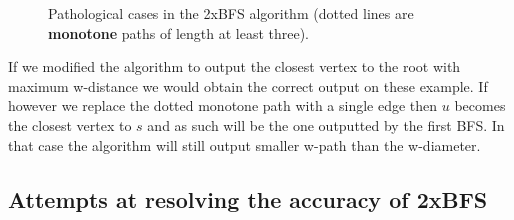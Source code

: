 \begin{figure}[h]
    \qquad
    \caption{Pathological cases in the 2xBFS algorithm (dotted lines are \textbf{monotone} paths of length at least three).}%
    \label{fig:path-cases}%
\end{figure}

If we modified the algorithm to output the closest vertex to the root with maximum w-distance we would obtain the correct output on these example. If however we replace the dotted monotone path with a single edge then $u$ becomes the closest vertex to $s$ and as such will be the one outputted by the first BFS. In that case the algorithm will still output smaller w-path than the w-diameter.


\subsection{Attempts at resolving the accuracy of 2xBFS}



